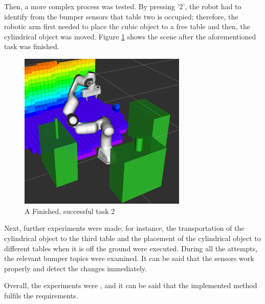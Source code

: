 Then, a more complex process was tested. By pressing '2', the robot had to identify from the bumper sensors that table two is occupied; therefore, the robotic arm first needed to place the cubic object to a free table and then, the cylindrical object was moved. Figure \ref{fig:task 2} shows the scene after the aforementioned task was finished.

\begin{figure}[h]
    \centering
    \includegraphics[width=8cm]{Images/task2.png}
    \caption{A Finished, successful task 2}
    \label{fig:task 2}
\end{figure}

Next, further experiments were made; for instance, the transportation of the cylindrical object to the third table and the placement of the cylindrical object to different tables when it is off the ground were executed. During all the attempts, the relevant bumper topics were examined. It can be said that the sensors work properly and detect the changes immediately. 

Overall, the experiments were , and it can be said that the implemented method fulfils the requirements. 
